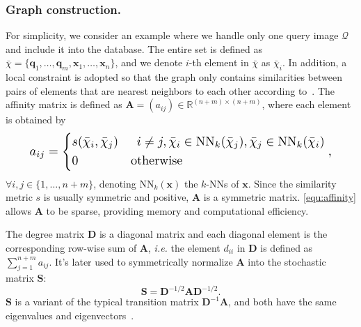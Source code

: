 \documentclass[letterpaper]{article} \usepackage{aaai19}  \usepackage{times}  \usepackage{helvet}  \usepackage{courier}  \usepackage{url}  \usepackage{graphicx}  \frenchspacing  \setlength{\pdfpagewidth}{8.5in}  \setlength{\pdfpageheight}{11in}
\begin{document}
\subsubsection{Graph construction.}
\label{sec:graph_construction}
For simplicity, we consider an example where we handle only one query image $\mathcal{Q}$ and include it into the database.
The entire set is defined as $\bar{\chi}=\{\mathbf{q}_1,\dots,\mathbf{q}_m,\mathbf{x}_1,\dots,\mathbf{x}_n\}$, and we denote $i$-th element in $\bar{\chi}$ as $\bar{\chi}_i$.
In addition, a local constraint is adopted so that the graph only contains similarities between pairs of elements that are nearest neighbors to each other according to~\cite{iscen2017efficient}.
The affinity matrix is defined as $\mathbf{A}=(a_{ij})\in\mathbb{R}^{(n+m)\times(n+m)}$, where each element is obtained by\begin{equation}
\label{equ:affinity}
\resizebox{.9\hsize}{!}{$
a_{ij} =
\left\{
\begin{aligned}
    & s(\bar{\chi}_i, \bar{\chi}_j) &i\neq j,\bar{\chi}_i\in\textrm{NN}_k(\bar{\chi}_j), \bar{\chi}_j\in\textrm{NN}_k(\bar{\chi}_i) \\
    & 0 &\textrm{otherwise} \qquad\qquad\qquad\qquad\qquad~~~~
\end{aligned}
\right.,
$}
\end{equation}
$\forall i,j \in \{1,\dots,n+m\}$, denoting $\textrm{NN}_k(\mathbf{x})$ the $k$-NNs of $\mathbf{x}$.
Since the similarity metric $s$ is usually symmetric and positive, $\mathbf{A}$ is a symmetric matrix.
\cref{equ:affinity} allows $\mathbf{A}$ to be sparse, providing memory and computational efficiency.

The degree matrix $\mathbf{D}$ is a diagonal matrix and each diagonal element is the corresponding row-wise sum of $\mathbf{A}$, \emph{i.e.} the element $d_{ii}$ in $\mathbf{D}$ is defined as $\sum_{j=1}^{n+m}a_{ij}$.
It's later used to symmetrically normalize $\mathbf{A}$ into the stochastic matrix $\mathbf{S}$:
\begin{equation}
\label{equ:normalization}
  \mathbf{S} = \mathbf{D}^{-1/2} \mathbf{A} \mathbf{D}^{-1/2}.
\end{equation}
$\mathbf{S}$ is a variant of the typical transition matrix $\mathbf{D}^{-1}\mathbf{A}$, and both have the same eigenvalues and eigenvectors~\cite{donoser2013diffusion}.
\end{document}
